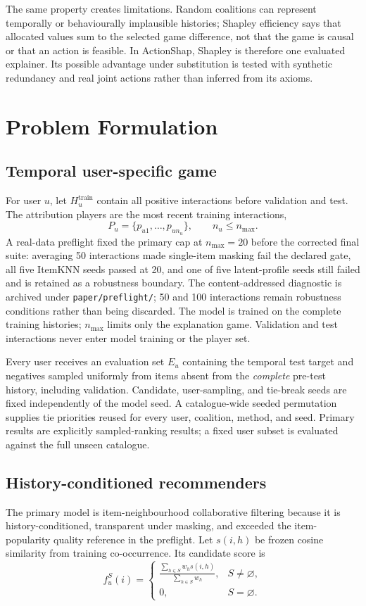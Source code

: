 \documentclass[11pt]{article}
\begin{document}
The same property creates limitations. Random coalitions can represent temporally or behaviourally implausible histories; Shapley efficiency says that allocated values sum to the selected game difference, not that the game is causal or that an action is feasible. In ActionShap, Shapley is therefore one evaluated explainer. Its possible advantage under substitution is tested with synthetic redundancy and real joint actions rather than inferred from its axioms.

\section{Problem Formulation}
\subsection{Temporal user-specific game}
For user $u$, let $H_u^{\mathrm{train}}$ contain all positive interactions before validation and test. The attribution players are the most recent training interactions,
\begin{equation}
P_u=\{p_{u1},\ldots,p_{un_u}\}, \qquad n_u\le n_{\max}.
\end{equation}
A real-data preflight fixed the primary cap at $n_{\max}=20$ before the corrected final suite: averaging 50 interactions made single-item masking fail the declared gate, all five ItemKNN seeds passed at 20, and one of five latent-profile seeds still failed and is retained as a robustness boundary. The content-addressed diagnostic is archived under \texttt{paper/preflight/}; 50 and 100 interactions remain robustness conditions rather than being discarded.
The model is trained on the complete training histories; $n_{\max}$ limits only the explanation game. Validation and test interactions never enter model training or the player set.

Every user receives an evaluation set $E_u$ containing the temporal test target and negatives sampled uniformly from items absent from the \emph{complete} pre-test history, including validation. Candidate, user-sampling, and tie-break seeds are fixed independently of the model seed. A catalogue-wide seeded permutation supplies tie priorities reused for every user, coalition, method, and seed. Primary results are explicitly sampled-ranking results; a fixed user subset is evaluated against the full unseen catalogue.

\subsection{History-conditioned recommenders}
The primary model is item-neighbourhood collaborative filtering because it is history-conditioned, transparent under masking, and exceeded the item-popularity quality reference in the preflight. Let $s(i,h)$ be frozen cosine similarity from training co-occurrence. Its candidate score is
\begin{equation}
f_u^S(i)=
\begin{cases}
\displaystyle\frac{\sum_{h\in S}w_h s(i,h)}{\sum_{h\in S}w_h},&S\ne\varnothing,\\[6pt]
0,&S=\varnothing.
\end{cases}
\end{equation}
\end{document}
